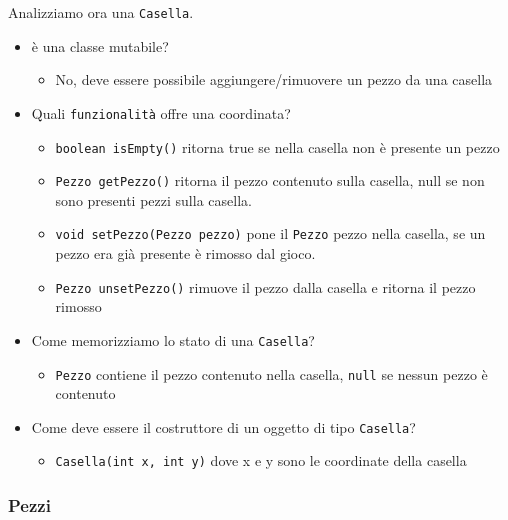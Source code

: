\documentclass{article}
\begin{document}



Analizziamo ora una \texttt{Casella}.

\begin{itemize}
\item \`e una classe mutabile?
\begin{itemize}
\item No, deve essere possibile aggiungere/rimuovere un pezzo da una casella
\end{itemize}
\item Quali \texttt{funzionalit\`a} offre una coordinata? 
\begin{itemize}
\item \texttt{boolean isEmpty()} ritorna true se nella casella non \`e presente un pezzo
\item \texttt{Pezzo getPezzo()} ritorna il pezzo contenuto sulla casella, null se non sono presenti pezzi sulla casella.
\item \texttt{void setPezzo(Pezzo pezzo)} pone il \texttt{Pezzo} pezzo nella casella, se un pezzo era gi\`a presente \`e rimosso dal gioco.
\item \texttt{Pezzo unsetPezzo()} rimuove il pezzo dalla casella e ritorna il pezzo rimosso
\end{itemize}
\item Come memorizziamo lo stato di una \texttt{Casella}?
\begin{itemize}
\item \texttt{Pezzo} contiene il pezzo contenuto nella casella, \texttt{null} se nessun pezzo \`e contenuto
\end{itemize}
\item Come deve essere il costruttore di un oggetto di tipo \texttt{Casella}?
\begin{itemize}
\item \texttt{Casella(int x, int y)} dove x e y sono le coordinate della casella
\end{itemize}
\end{itemize}



\subsubsection{Pezzi}
\end{document}
